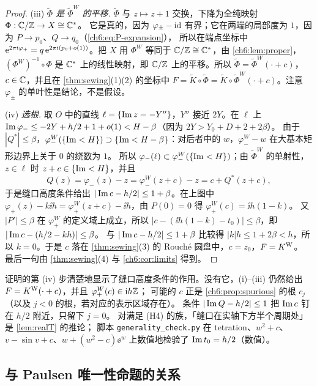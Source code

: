 \begin{proof}
(iii) \emph{$\tilde\Phi$ 是 $\tilde\Phi^W$ 的平移.} $\tilde\Phi$ 与 $z\mapsto z+1$ 交换，下降为全纯映射 $\Phi:\mathbb{C}/\mathbb{Z}\to X\cong\mathbb{C}^*$。
它是真的，因为 $\varphi_\pm-\mathrm{id}$ 有界；它在两端的局部度为 $1$，因为 $P\to p_0$、$Q\to q_0$（\eqref{ch6:eq:P-expansion}），
所以在端点坐标中 $\mathrm{e}^{2\pi\mathrm{i} \varphi_+}=q\,\mathrm{e}^{2\pi\mathrm{i} (p_0+o(1))}$。把 $X$ 用 $\Phi^W$ 等同于 $\mathbb{C}/\mathbb{Z}\cong\mathbb{C}^*$，由 \cref{ch6:lem:proper}，
$(\Phi^W)^{-1}\circ\Phi$ 是 $\mathbb{C}^*$ 上的线性映射，即 $\mathbb{C}/\mathbb{Z}$ 上的平移。所以 $\tilde\Phi=\tilde\Phi^W(\cdot+c)$，$c\in\mathbb{C}$，并且在 \cref{thm:sewing}(1)(2) 的坐标中
$F=\tilde K\circ\tilde\Phi=\tilde K\circ\tilde\Phi^W(\cdot+c)$。注意 $\varphi_\pm$ 的单叶性是结论，不是假设。

(iv) \emph{选根.} 取 $O$ 中的直线 $\ell=\{\operatorname{Im} z=-Y''\}$，$Y''$ 接近 $2Y$。在 $\ell$ 上 $\operatorname{Im}\varphi_-\le-2Y+h/2+1+o(1)<H-\beta$（因为 $2Y>Y_0+D+2+2\beta$）。
由于 $|Q^*|\le\beta$，$\varphi_-^W(\{\operatorname{Im}<H\})\supset\{\operatorname{Im}<H-\beta\}$：对后者中的 $w$，$\varphi_-^W-w$ 在大基本矩形边界上关于 $0$ 的绕数为 $1$。
所以 $\varphi_-(\ell)\subset\varphi^W_-(\{\operatorname{Im}<H\})$；由 $\tilde\Phi^W$ 的单射性，$z\in\ell$ 时 $z+c\in\{\operatorname{Im}<H\}$，并且
\[
 Q(z)=\varphi_-(z)-z=\varphi_-^W(z+c)-z=c+Q^*(z+c),
\]
于是缝口高度条件给出 $|\operatorname{Im} c-h/2|\le1+\beta$。在上图中 $\varphi_+(z)-k\ii h=\varphi^W_+(z+c)-\ii h$，由 $P(0)=0$ 得 $\varphi^W_+(c)=\ii h(1-k)$。
又 $|P'|\le\beta$ 在 $\varphi^W_+$ 的定义域上成立，所以 $|c-(\ii h(1-k)-t_0)|\le\beta$，即 $|\operatorname{Im} c-(h/2-kh)|\le\beta$。
与 $|\operatorname{Im} c-h/2|\le1+\beta$ 比较得 $|k|h\le1+2\beta<h$，所以 $k=0$。于是 $c$ 落在 \cref{thm:sewing}(3) 的 Rouché 圆盘中，$c=z_0$，$F=K^{\mathrm W}$。
最后一句由 \cref{thm:sewing}(4) 与 \cref{ch6:cor:limits} 得到。
\end{proof}

\begin{remark}[选根]\label{ch6:rem:root}
证明的第 (iv) 步清楚地显示了缝口高度条件的作用。没有它，(i)--(iii) 仍然给出 $F=K^{\mathrm W}(\cdot+c)$，并且 $\varphi_+^W(c)\in\mathrm{i} h\mathbb{Z}$；
可能的 $c$ 正是 \cref{ch6:prop:spurious} 的根 $c_j$（以及 $j<0$ 的根，若对应的表示区域存在）。
条件 $|\operatorname{Im} Q-h/2|\le1$ 把 $\operatorname{Im} c$ 钉在 $h/2$ 附近，只留下 $j=0$。
对满足 (H4) 的族，「缝口在实轴下方半个周期处」是 \cref{lem:realT} 的推论；
脚本 \texttt{generality\_check.py} 在 tetration、$w^2+c$、$v-\sin v+c$、$w+(w^2-c)\ee^w$ 上数值地检验了 $\operatorname{Im} t_0=h/2$（数值）。
\end{remark}

\subsection{与 Paulsen 唯一性命题的关系}

